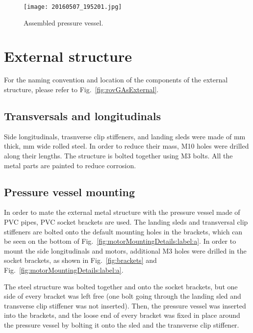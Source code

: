 \begin{figure}[htb]
\begin{minipage}[b]{1\linewidth}
  \centering
	\texttt{[image: 20160507\_195201.jpg]}
\end{minipage}
\caption{Assembled pressure vessel.}
\label{fig:assembledPressureVessel}
\end{figure}

\clearpage %

\section{External structure}\label{section:externalStructure}
For the naming convention and location of the components of the external structure, please refer to Fig.~\ref{fig:rovGAsExternal}.

\subsection{Transversals and longitudinals}
Side longitudinals, trasnverse clip stiffeners, and landing sleds were made of \unit[2]{mm} thick, \unit[20]{mm} wide rolled steel. In order to reduce their mass, M10 holes were drilled along their lengths. The structure is bolted together using M3 bolts. All the metal parts are painted to reduce corrosion.

\subsection{Pressure vessel mounting}
In order to mate the external metal structure with the pressure vessel made of PVC pipes, PVC socket brackets are used. The landing sleds and transversal clip stiffeners are bolted onto the default mounting holes in the brackets, which can be seen on the bottom of Fig.~\ref{fig:motorMountingDetails:label:a}. In order to mount the side longitudinals and motors, additional M3 holes were drilled in the socket brackets, as shown in Fig.~\ref{fig:brackets} and Fig.~\ref{fig:motorMountingDetails:label:a}.

The steel structure was bolted together and onto the socket brackets, but one side of every bracket was left free (one bolt going through the landing sled and transverse clip stiffener was not inserted). Then, the pressure vessel was inserted into the brackets, and the loose end of every bracket was fixed in place around the pressure vessel by bolting it onto the sled and the transverse clip stiffener.

